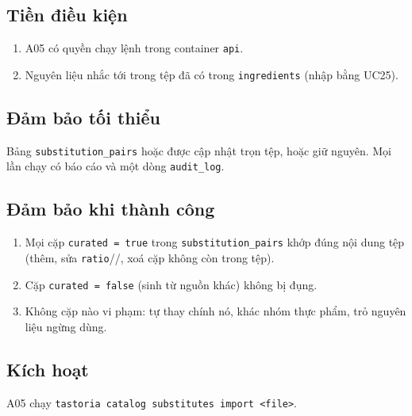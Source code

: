 \subsection{Tiền điều kiện}
\begin{enumerate}
\item A05 có quyền chạy lệnh trong container {\small\texttt{api}}.
\item Nguyên liệu nhắc tới trong tệp đã có trong {\small\texttt{ingredients}} (nhập bằng UC25).
\end{enumerate}
\subsection{Đảm bảo tối thiểu}
Bảng {\small\texttt{substitution\_\allowbreak{}\allowbreak{}pairs}} hoặc được cập nhật trọn tệp, hoặc giữ nguyên. Mọi lần chạy có báo cáo và một dòng {\small\texttt{audit\_\allowbreak{}\allowbreak{}log}}.

\subsection{Đảm bảo khi thành công}
\begin{enumerate}
\item Mọi cặp {\small\texttt{curated = true}} trong {\small\texttt{substitution\_\allowbreak{}\allowbreak{}pairs}} khớp đúng nội dung tệp (thêm, sửa {\small\texttt{ratio}}//, xoá cặp không còn trong tệp).
\item Cặp {\small\texttt{curated = false}} (sinh từ nguồn khác) không bị đụng.
\item Không cặp nào vi phạm: tự thay chính nó, khác nhóm thực phẩm, trỏ nguyên liệu ngừng dùng.
\end{enumerate}
\subsection{Kích hoạt}
A05 chạy {\small\texttt{tastoria catalog substitutes import <file>}}.


